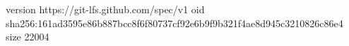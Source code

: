 version https://git-lfs.github.com/spec/v1
oid sha256:161ad3595e86b887bcc8f6f80737cf92e6b9f9b321f4ae8d945c3210826c86e4
size 22004
